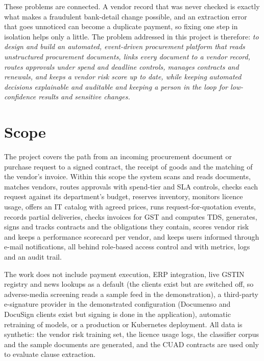 These problems are connected. A vendor record that was never checked is exactly what makes a fraudulent bank-detail change possible, and an extraction error that goes unnoticed can become a duplicate payment, so fixing one step in isolation helps only a little. The problem addressed in this project is therefore: \textit{to design and build an automated, event-driven procurement platform that reads unstructured procurement documents, links every document to a vendor record, routes approvals under spend and deadline controls, manages contracts and renewals, and keeps a vendor risk score up to date, while keeping automated decisions explainable and auditable and keeping a person in the loop for low-confidence results and sensitive changes.}

\section{Scope}\label{sec:scope3}
The project covers the path from an incoming procurement document or purchase request to a signed contract, the receipt of goods and the matching of the vendor's invoice. Within this scope the system scans and reads documents, matches vendors, routes approvals with spend-tier and SLA controls, checks each request against its department's budget, reserves inventory, monitors licence usage, offers an IT catalog with agreed prices, runs request-for-quotation events, records partial deliveries, checks invoices for GST and computes TDS, generates, signs and tracks contracts and the obligations they contain, scores vendor risk and keeps a performance scorecard per vendor, and keeps users informed through e-mail notifications, all behind role-based access control and with metrics, logs and an audit trail.

The work does not include payment execution, ERP integration, live GSTIN registry and news lookups as a default (the clients exist but are switched off, so adverse-media screening reads a sample feed in the demonstration), a third-party e-signature provider in the demonstrated configuration (Documenso and DocuSign clients exist but signing is done in the application), automatic retraining of models, or a production or Kubernetes deployment. All data is synthetic: the vendor risk training set, the licence usage logs, the classifier corpus and the sample documents are generated, and the CUAD contracts are used only to evaluate clause extraction.

